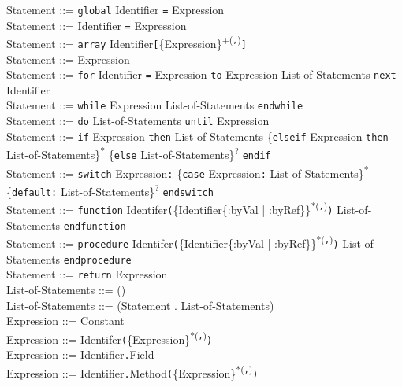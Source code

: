 \documentclass{article}
\begin{document}
\begin{listing}
	\noindent
	Statement ::= \texttt{global} Identifier \texttt{=} Expression\\
	Statement ::= Identifier \texttt{=} Expression\\
	Statement ::= \texttt{array} Identifier\texttt{[}\{Expression\}\textsuperscript{+(\texttt{,})}\texttt{]}\\
	Statement ::= Expression\\
	Statement ::= \texttt{for} Identifier \texttt{=} Expression \texttt{to} Expression List-of-Statements \texttt{next} Identifier\\
	Statement ::= \texttt{while} Expression List-of-Statements \texttt{endwhile}\\
	Statement ::= \texttt{do} List-of-Statements \texttt{until} Expression\\

	\noindent
	Statement ::= \texttt{if} Expression \texttt{then} List-of-Statements \{\texttt{elseif} Expression \texttt{then} List-of-Statements\}\textsuperscript{*} \{\texttt{else} List-of-Statements\}\textsuperscript{?} \texttt{endif}\\
	Statement ::= \texttt{switch} Expression\texttt{:} \{\texttt{case} Expression\texttt{:} List-of-Statements\}\textsuperscript{*} \{\texttt{default:} List-of-Statements\}\textsuperscript{?} \texttt{endswitch}\\

	\noindent
	Statement ::= \texttt{function} Identifer\texttt{(}\{Identifier\{:byVal | :byRef\}\}\textsuperscript{*(\texttt{,})}\texttt{)} List-of-Statements \texttt{endfunction}\\
	Statement ::= \texttt{procedure} Identifer\texttt{(}\{Identifier\{:byVal | :byRef\}\}\textsuperscript{*(\texttt{,})}\texttt{)} List-of-Statements \texttt{endprocedure}\\
	Statement ::= \texttt{return} Expression\\

	\noindent
	List-of-Statements ::= ()\\
	List-of-Statements ::= (Statement . List-of-Statements)\\

	\noindent
	Expression ::= Constant\\
	Expression ::= Identifer\texttt{(}\{Expression\}\textsuperscript{*(\texttt{,})}\texttt{)}\\
	Expression ::= Identifier\texttt{.}Field\\
	Expression ::= Identifier\texttt{.}Method\texttt{(}\{Expression\}\textsuperscript{*(\texttt{,})}\texttt{)}\\


\end{listing}
\end{document}

